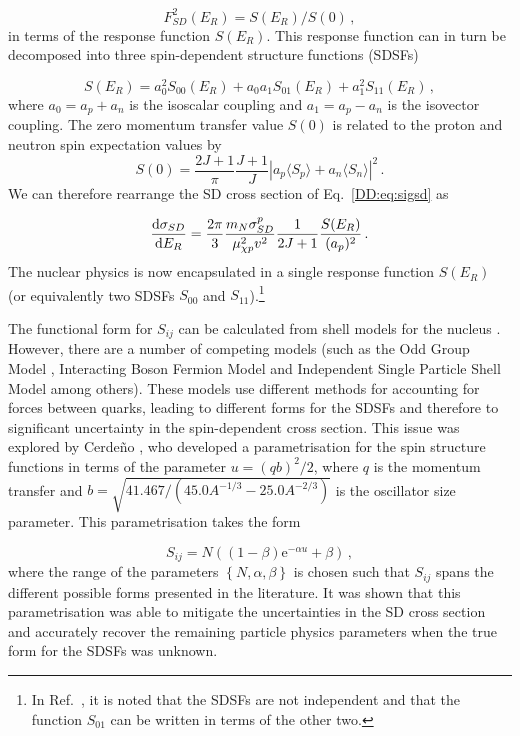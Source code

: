 \begin{equation}
F_{SD}^2(E_R) = S(E_R)/S(0)\,,
\end{equation}
in terms of the response function $S(E_R)$. This response function can in turn be decomposed into three spin-dependent structure functions (SDSFs)

\begin{equation}
S(E_R) = a_0^2S_{00}(E_R) + a_0a_1S_{01}(E_R) + a_1^2S_{11}(E_R)\,,
\end{equation}
where $a_0 = a_p + a_n$ is the isoscalar coupling and $a_1 = a_p - a_n$ is the isovector coupling. The zero momentum transfer value $S(0)$ is related to the proton and neutron spin expectation values by \cite{Cannoni:2013}
\begin{equation}
S(0) = \frac{2J + 1}{\pi} \frac{J+1}{J} \left|a_p\langle S_p \rangle + a_n \langle S_n \rangle\right|^2\,.
\end{equation}
We can therefore rearrange the SD cross section of Eq.~\ref{DD:eq:sigsd} as

\begin{equation}
\frac{\mathrm{d}\sigma_{SD}}{\mathrm{d}E_R} = \frac{2\pi}{3} \frac{m_N \sigma_{SD}^p}{\mu_{\chi p}^2 v^2} \frac{1}{2J+1} \frac{S(E_R)}{(a_p)^2}\,.
\end{equation}
The nuclear physics is now encapsulated in a single response function $S(E_R)$ (or equivalently two SDSFs $S_{00}$ and $S_{11}$).\footnote{In Ref.~\cite{Cannoni:2013}, it is noted that the SDSFs are not independent and that the function $S_{01}$ can be written in terms of the other two.}

The functional form for $S_{ij}$ can be calculated from shell models for the nucleus \cite{Ressell:1997}. However, there are a number of competing models (such as the Odd Group Model \cite{Engel:1989}, Interacting Boson Fermion Model \cite{Iachello:1991} and Independent Single Particle Shell Model \cite{Ellis:1988} among others). These models use different methods for accounting for forces between quarks, leading to different forms for the SDSFs and therefore to significant uncertainty in the spin-dependent cross section. This issue was explored by Cerde\~{n}o \etal \cite{Cerdeno:2012}, who developed a parametrisation for the spin structure functions in terms of the parameter $u = (qb)^2/2$, where $q$ is the momentum transfer and $b = \sqrt{41.467/(45.0 A^{-1/3} - 25.0 A^{-2/3})}$ is the oscillator size parameter. This parametrisation takes the form

\begin{equation}
\label{eq:SDparametrisation}
S_{ij} = N ((1-\beta)\mathrm{e}^{-\alpha u} + \beta)\,,
\end{equation}
where the range of the parameters $\left\{N, \alpha, \beta\right\}$ is chosen such that $S_{ij}$ spans the different possible forms presented in the literature. It was shown that this parametrisation was able to mitigate the uncertainties in the SD cross section and accurately recover the remaining particle physics parameters when the true form for the SDSFs was unknown.

